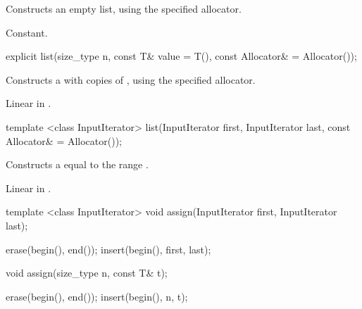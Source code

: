 \begin{itemdescr}
\pnum
\effects
Constructs an empty list, using the specified allocator.

\pnum
\complexity
Constant.
\end{itemdescr}

%
%
\begin{itemdecl}
explicit list(size_type n, const T& value = T(),
              const Allocator& = Allocator());
\end{itemdecl}

\begin{itemdescr}
\pnum
\effects
Constructs a
with
copies of
,
using the specified allocator.

\pnum
\complexity
Linear in
.
\end{itemdescr}

%
%
\begin{itemdecl}
template <class InputIterator>
list(InputIterator first, InputIterator last,
     const Allocator& = Allocator());
\end{itemdecl}

\begin{itemdescr}
\pnum
\effects
Constructs a
equal to the range
.

\pnum
\complexity
Linear in
.
\end{itemdescr}

%
\begin{itemdecl}
template <class InputIterator>
  void assign(InputIterator first, InputIterator last);
\end{itemdecl}

\begin{itemdescr}
\pnum
\effects
\begin{codeblock}
    erase(begin(), end());
    insert(begin(), first, last);
\end{codeblock}
\end{itemdescr}

%
%
\begin{itemdecl}
void assign(size_type n, const T& t);
\end{itemdecl}

\begin{itemdescr}
\pnum
\effects
\begin{codeblock}
    erase(begin(), end());
    insert(begin(), n, t);
\end{codeblock}
\end{itemdescr}

